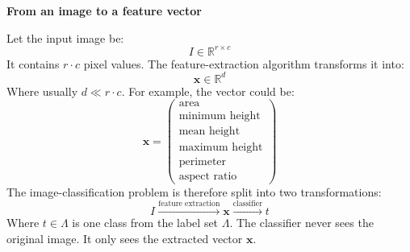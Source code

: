 \begin{flushleft}
    \textcolor{Green3}{ \textbf{From an image to a feature vector}}
\end{flushleft}
Let the input image be:
\begin{equation*}
    I \in \mathbb{R}^{r \times c}
\end{equation*}
It contains $r \cdot c$ pixel values. The feature-extraction algorithm transforms it into:
\begin{equation*}
    \mathbf{x} \in \mathbb{R}^{d}
\end{equation*}
Where usually $d \ll r \cdot c$. For example, the vector could be:
\begin{equation*}
    \mathbf{x} = \begin{pmatrix}
        \text{area} \\
        \text{minimum height} \\
        \text{mean height} \\
        \text{maximum height} \\
        \text{perimeter} \\
        \text{aspect ratio}
    \end{pmatrix}
\end{equation*}
The image-classification problem is therefore split into two transformations:
\begin{equation*}
    I \xrightarrow{\text{feature extraction}} \mathbf{x} \xrightarrow{\text{classifier}} t
\end{equation*}
Where $t \in \Lambda$ is one class from the label set $\Lambda$. The classifier never sees the original image. It only sees the extracted vector $\mathbf{x}$.

